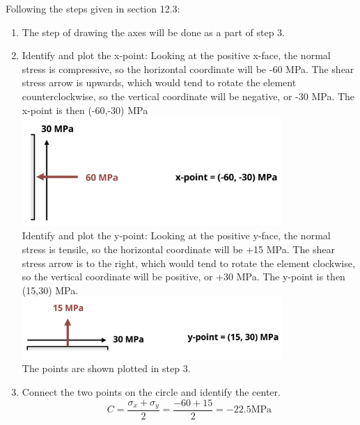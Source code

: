 \documentclass[
  letterpaper,
  DIV=11,
  numbers=noendperiod]{scrreprt}
\theoremstyle{definition}
\theoremstyle{remark}
\begin{document}
\begin{tcolorbox}
\begin{tcolorbox}
Following the steps given in section 12.3:

\begin{enumerate}
\def\labelenumi{\arabic{enumi}.}
\item
  The step of drawing the axes will be done as a part of step 3.
\item
  Identify and plot the x-point: Looking at the positive x-face, the
  normal stress is compressive, so the horizontal coordinate will be -60
  MPa. The shear stress arrow is upwards, which would tend to rotate the
  element counterclockwise, so the vertical coordinate will be negative,
  or -30 MPa. The x-point is then (-60,-30) MPa\\
  \includegraphics[width=3.88542in,height=\textheight]{images/CH12 figures/example 12.4 part 2.png}\\
  Identify and plot the y-point: Looking at the positive y-face, the
  normal stress is tensile, so the horizontal coordinate will be +15
  MPa. The shear stress arrow is to the right, which would tend to
  rotate the element clockwise, so the vertical coordinate will be
  positive, or +30 MPa. The y-point is then (15,30) MPa.\\
  \includegraphics[width=3.89583in,height=\textheight]{images/CH12 figures/example 12.4 part 3.png}\\
  The points are shown plotted in step 3.
\item
  Connect the two points on the circle and identify the center.\\
  \[
  C=\frac{\sigma_x+\sigma_y}{2}=\frac{-60+15}{2}=-22.5 \mathrm{MPa}
  \]\\

\end{enumerate}
\end{tcolorbox}
\end{tcolorbox}
\end{document}
